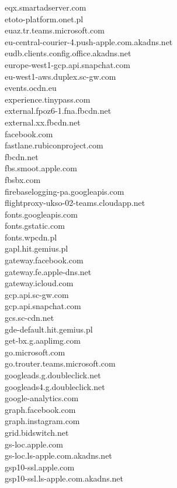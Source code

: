 \documentclass[12pt,a4paper]{article}
\begin{document}
\begin{scriptsize}
\begin{multicols}{3}
\begin{center}
                    eqx.smartadserver.com\\etoto-platform.onet.pl\\euaz.tr.teams.microsoft.com\\eu-central-courier-4.push-apple.com.akadns.net\\
                    eudb.clients.config.office.akadns.net\\europe-west1-gcp.api.snapchat.com\\eu-west1-aws.duplex.sc-gw.com\\
                    events.ocdn.eu\\experience.tinypass.com\\external.fpoz6-1.fna.fbcdn.net\\external.xx.fbcdn.net\\facebook.com\\
                    fastlane.rubiconproject.com\\fbcdn.net\\fbs.smoot.apple.com\\fbsbx.com\\firebaselogging-pa.googleapis.com\\
                    flightproxy-ukso-02-teams.cloudapp.net\\fonts.googleapis.com\\fonts.gstatic.com\\fonts.wpcdn.pl\\gapl.hit.gemius.pl\\
                    gateway.facebook.com\\gateway.fe.apple-dns.net\\gateway.icloud.com\\gcp.api.sc-gw.com\\gcp.api.snapchat.com\\
                    gcs.sc-cdn.net\\gde-default.hit.gemius.pl\\get-bx.g.aaplimg.com\\go.microsoft.com\\go.trouter.teams.microsoft.com\\
                    googleads.g.doubleclick.net\\googleads4.g.doubleclick.net\\google-analytics.com\\graph.facebook.com\\graph.instagram.com\\
                    grid.bidswitch.net\\gs-loc.apple.com\\gs-loc.ls-apple.com.akadns.net\\gsp10-ssl.apple.com\\gsp10-ssl.ls-apple.com.akadns.net\\

\end{center}
\end{multicols}
\end{scriptsize}
\end{document}
